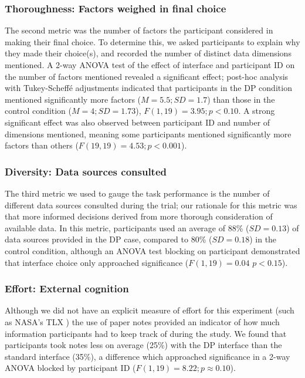 \documentclass{sigchi}
\begin{document}
\subsubsection{Thoroughness: Factors weighed in final choice}
The second metric was the number of factors the participant considered in making their final choice. To determine this, we asked participants to explain why they made their choice(s), and recorded the number of distinct data dimensions mentioned.  A 2-way ANOVA test of the effect of interface and participant ID on the number of factors mentioned revealed a significant effect; post-hoc analysis with Tukey-Scheff\'{e} adjustments indicated that participants in the DP condition mentioned significantly more factors ($M=5.5; SD=1.7$) than those in the control condition ($M=4; SD=1.73$), $F(1,19)=3.95; p<0.10$. A strong significant effect was also observed between participant ID and number of dimensions mentioned, meaning some participants mentioned significantly more factors than others ($F(19,19)=4.53; p < 0.001$).

\subsubsection{Diversity: Data sources consulted}
The third metric we used to gauge the task performance is the number of different data sources consulted during the trial; our rationale for this metric was that more informed decisions derived from more thorough consideration of available data. In this metric, participants used an average of 88\% ($SD=0.13$) of data sources provided in the DP case, compared to 80\% ($SD=0.18$) in the control condition, although an ANOVA test blocking on participant demonstrated that interface choice only approached significance ($F(1,19)=0.04$ $p < 0.15$).

\subsubsection{Effort: External cognition}
Although we did not have an explicit measure of effort for this experiment (such as NASA's TLX \cite{tlx}) the use of paper notes provided an indicator of how much information participants had to keep track of during the study.  We found that participants took notes less on average (25\%) with the DP interface than the standard interface (35\%), a difference which approached significance in a 2-way ANOVA blocked by participant ID ($F(1,19)= 8.22; p\approx0.10$).
\end{document}
